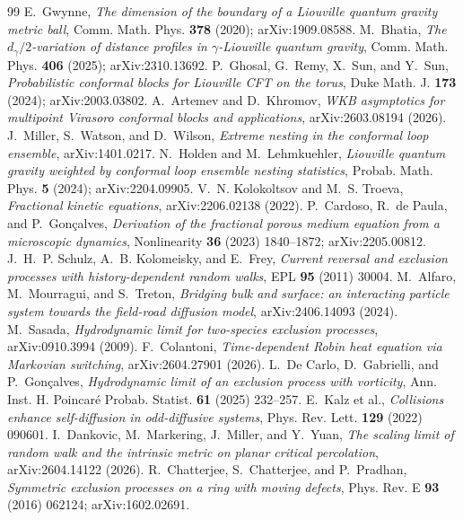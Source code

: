 \documentclass[11pt]{article}
\theoremstyle{definition}
\begin{document}
\begin{thebibliography}{99}
 E.~Gwynne, \emph{The dimension of the boundary of a Liouville quantum gravity metric ball}, Comm. Math. Phys. \textbf{378} (2020); arXiv:1909.08588.
 M.~Bhatia, \emph{The $d_\gamma/2$-variation of distance profiles in $\gamma$-Liouville quantum gravity}, Comm. Math. Phys. \textbf{406} (2025); arXiv:2310.13692.
 P.~Ghosal, G.~Remy, X.~Sun, and Y.~Sun, \emph{Probabilistic conformal blocks for Liouville CFT on the torus}, Duke Math. J. \textbf{173} (2024); arXiv:2003.03802.
 A.~Artemev and D.~Khromov, \emph{WKB asymptotics for multipoint Virasoro conformal blocks and applications}, arXiv:2603.08194 (2026).
 J.~Miller, S.~Watson, and D.~Wilson, \emph{Extreme nesting in the conformal loop ensemble}, arXiv:1401.0217.
 N.~Holden and M.~Lehmkuehler, \emph{Liouville quantum gravity weighted by conformal loop ensemble nesting statistics}, Probab. Math. Phys. \textbf{5} (2024); arXiv:2204.09905.
 V.~N. Kolokoltsov and M.~S. Troeva, \emph{Fractional kinetic equations}, arXiv:2206.02138 (2022).
 P.~Cardoso, R.~de Paula, and P.~Gon\c calves, \emph{Derivation of the fractional porous medium equation from a microscopic dynamics}, Nonlinearity \textbf{36} (2023) 1840--1872; arXiv:2205.00812.
 J.~H.~P. Schulz, A.~B. Kolomeisky, and E.~Frey, \emph{Current reversal and exclusion processes with history-dependent random walks}, EPL \textbf{95} (2011) 30004.
 M.~Alfaro, M.~Mourragui, and S.~Treton, \emph{Bridging bulk and surface: an interacting particle system towards the field-road diffusion model}, arXiv:2406.14093 (2024).
 M.~Sasada, \emph{Hydrodynamic limit for two-species exclusion processes}, arXiv:0910.3994 (2009).
 F.~Colantoni, \emph{Time-dependent Robin heat equation via Markovian switching}, arXiv:2604.27901 (2026).
 L.~De Carlo, D.~Gabrielli, and P.~Gon\c calves, \emph{Hydrodynamic limit of an exclusion process with vorticity}, Ann. Inst. H. Poincar\'e Probab. Statist. \textbf{61} (2025) 232--257.
 E.~Kalz et al., \emph{Collisions enhance self-diffusion in odd-diffusive systems}, Phys. Rev. Lett. \textbf{129} (2022) 090601.
 I.~Dankovic, M.~Markering, J.~Miller, and Y.~Yuan, \emph{The scaling limit of random walk and the intrinsic metric on planar critical percolation}, arXiv:2604.14122 (2026).
 R.~Chatterjee, S.~Chatterjee, and P.~Pradhan, \emph{Symmetric exclusion processes on a ring with moving defects}, Phys. Rev. E \textbf{93} (2016) 062124; arXiv:1602.02691.

\end{thebibliography}
\end{document}
